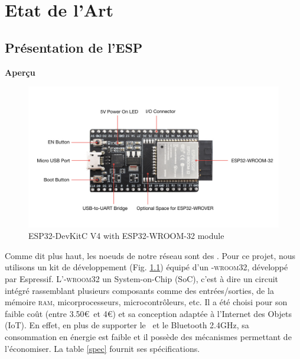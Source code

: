 \chapter{Etat de l'Art}

\section{Présentation de l'ESP}
    \textbf{Aperçu}

    \begin{figure}[H]
        \centering
        \includegraphics[scale=0.3]{images/esp32-devkitc.jpg}
        \caption{ESP32-DevKitC V4 with ESP32-WROOM-32 module
            \cite{esp32-gettingStarted}}
        \label{esp32_img}
    \end{figure}
    Comme dit plus haut, les noeuds de notre réseau sont des \esp.
    Pour ce projet, nous utilisons un kit de développement (Fig. \ref{esp32_img}) équipé d'un
    \esp\textsc{-wroom32}, développé par Espressif. L'\esp\textsc{-wroom32}
    un System-on-Chip (SoC), c'est à dire un circuit intégré rassemblant plusieurs
    composants comme des entrées/sorties, de la mémoire \textsc{ram}, micorprocesseurs,
    microcontrôleurs, etc.
    Il a été choisi pour son faible coût (entre 3.50\euro\ et 4\euro) et sa conception adaptée à l'Internet des Objets (IoT). 
    En effet, en plus de supporter le \wifi\ et le Bluetooth 2.4GHz,
    sa consommation en énergie est faible et il possède des mécanismes permettant de l'économiser. %
    La table \ref{spec} fournit ses spécifications.
